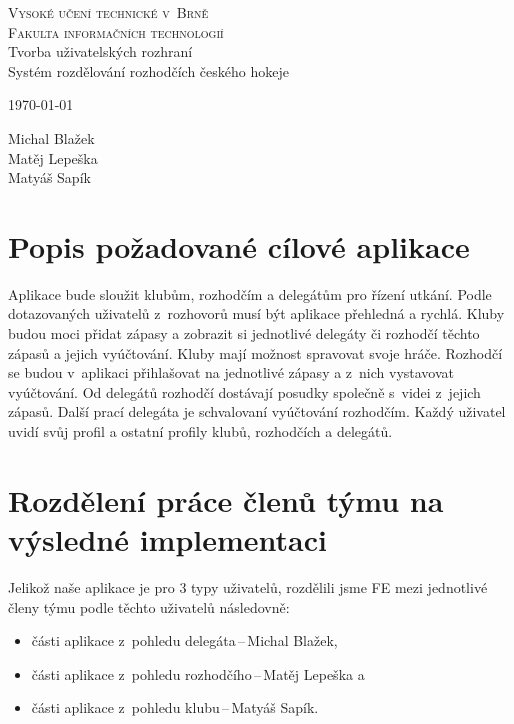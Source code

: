 \documentclass[a4paper, 11pt]{article}
\begin{document}
\begin{titlepage}
\begin{center}
    \Huge
    \textsc{Vysoké učení technické v~Brně\\
    \huge{Fakulta informačních technologií}}\\
    \LARGE{Tvorba uživatelských rozhraní}\\
    \Huge{Systém rozdělování rozhodčích českého hokeje}\\
\end{center}
{\Large \today \hfill \parbox{5cm}{\raggedleft Michal Blažek\\Matěj Lepeška\\Matyáš Sapík}}
\end{titlepage}

\section{Popis požadované cílové aplikace}

Aplikace bude sloužit klubům, rozhodčím a delegátům pro řízení utkání. Podle
dotazovaných uživatelů z~rozhovorů musí být aplikace přehledná a rychlá. Kluby budou
moci přidat zápasy a zobrazit si jednotlivé delegáty či rozhodčí těchto zápasů a jejich
vyúčtování. Kluby mají možnost spravovat svoje hráče. Rozhodčí se budou v~aplikaci
přihlašovat na jednotlivé zápasy a z~nich vystavovat vyúčtování. Od delegátů rozhodčí
dostávají posudky společně s~videi z~jejich zápasů. Další prací delegáta je schvalovaní
vyúčtování rozhodčím. Každý uživatel uvidí svůj profil a ostatní profily klubů, rozhodčích a
delegátů.

\section{Rozdělení práce členů týmu na výsledné implementaci}

Jelikož naše aplikace je pro 3 typy uživatelů, rozdělili jsme FE mezi jednotlivé členy týmu
podle těchto uživatelů následovně:
\begin{itemize}
    \item části aplikace z~pohledu delegáta\,--\,Michal Blažek,
    \item části aplikace z~pohledu rozhodčího\,--\,Matěj Lepeška a
    \item části aplikace z~pohledu klubu\,--\,Matyáš Sapík.
\end{itemize}
\end{document}
